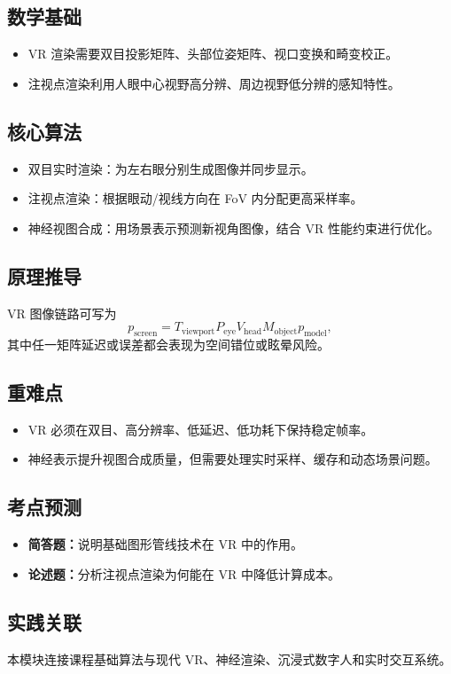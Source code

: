 \documentclass[UTF8,fontset=fandol,11pt]{ctexart}
\newcommand{\exam}[1]{\textcolor{blue!55!black}{\textbf{#1}}}
\begin{document}
\subsection{数学基础}
\begin{itemize}
  \item VR 渲染需要双目投影矩阵、头部位姿矩阵、视口变换和畸变校正。
  \item 注视点渲染利用人眼中心视野高分辨、周边视野低分辨的感知特性。
\end{itemize}
\subsection{核心算法}
\begin{itemize}
  \item 双目实时渲染：为左右眼分别生成图像并同步显示。
  \item 注视点渲染：根据眼动/视线方向在 FoV 内分配更高采样率。
  \item 神经视图合成：用场景表示预测新视角图像，结合 VR 性能约束进行优化。
\end{itemize}
\subsection{原理推导}
VR 图像链路可写为
\[
  p_{\text{screen}}=T_{\text{viewport}}P_{\text{eye}}V_{\text{head}}M_{\text{object}}p_{\text{model}},
\]
其中任一矩阵延迟或误差都会表现为空间错位或眩晕风险。
\subsection{重难点}
\begin{itemize}
  \item VR 必须在双目、高分辨率、低延迟、低功耗下保持稳定帧率。
  \item 神经表示提升视图合成质量，但需要处理实时采样、缓存和动态场景问题。
\end{itemize}
\subsection{考点预测}
\begin{itemize}
  \item \exam{简答题：}说明基础图形管线技术在 VR 中的作用。
  \item \exam{论述题：}分析注视点渲染为何能在 VR 中降低计算成本。
\end{itemize}
\subsection{实践关联}
本模块连接课程基础算法与现代 VR、神经渲染、沉浸式数字人和实时交互系统。
\end{document}
